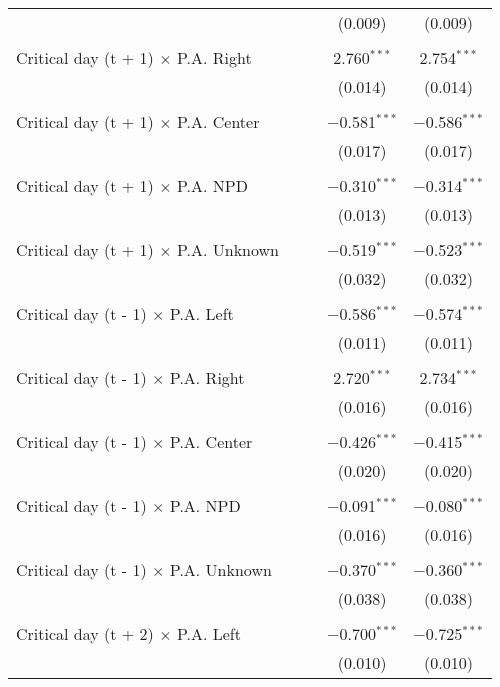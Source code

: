 \documentclass[
]{article}
\begin{document}
\begin{table}[!htbp]
{\begin{tabular}{@{\extracolsep{5pt}}lcccc}
  &  &  & (0.009) & (0.009) \\ 
  & & & & \\ 
 Critical day (t + 1) $\times$ P.A. Right &  &  & 2.760$^{***}$ & 2.754$^{***}$ \\ 
  &  &  & (0.014) & (0.014) \\ 
  & & & & \\ 
 Critical day (t + 1) $\times$ P.A. Center &  &  & $-$0.581$^{***}$ & $-$0.586$^{***}$ \\ 
  &  &  & (0.017) & (0.017) \\ 
  & & & & \\ 
 Critical day (t + 1) $\times$ P.A. NPD &  &  & $-$0.310$^{***}$ & $-$0.314$^{***}$ \\ 
  &  &  & (0.013) & (0.013) \\ 
  & & & & \\ 
 Critical day (t + 1) $\times$ P.A. Unknown &  &  & $-$0.519$^{***}$ & $-$0.523$^{***}$ \\ 
  &  &  & (0.032) & (0.032) \\ 
  & & & & \\ 
 Critical day (t - 1) $\times$ P.A. Left &  &  & $-$0.586$^{***}$ & $-$0.574$^{***}$ \\ 
  &  &  & (0.011) & (0.011) \\ 
  & & & & \\ 
 Critical day (t - 1) $\times$ P.A. Right &  &  & 2.720$^{***}$ & 2.734$^{***}$ \\ 
  &  &  & (0.016) & (0.016) \\ 
  & & & & \\ 
 Critical day (t - 1) $\times$ P.A. Center &  &  & $-$0.426$^{***}$ & $-$0.415$^{***}$ \\ 
  &  &  & (0.020) & (0.020) \\ 
  & & & & \\ 
 Critical day (t - 1) $\times$ P.A. NPD &  &  & $-$0.091$^{***}$ & $-$0.080$^{***}$ \\ 
  &  &  & (0.016) & (0.016) \\ 
  & & & & \\ 
 Critical day (t - 1) $\times$ P.A. Unknown &  &  & $-$0.370$^{***}$ & $-$0.360$^{***}$ \\ 
  &  &  & (0.038) & (0.038) \\ 
  & & & & \\ 
 Critical day (t + 2) $\times$ P.A. Left &  &  & $-$0.700$^{***}$ & $-$0.725$^{***}$ \\ 
  &  &  & (0.010) & (0.010) \\ 

\end{tabular}}
\end{table}
\end{document}
